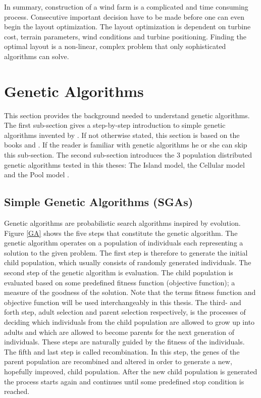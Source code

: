 \noindent In summary, construction of a wind farm is a complicated and time consuming process. Consecutive important decision have to be made before one can even begin the layout optimization. The layout optimization is dependent on turbine cost, terrain parameters, wind conditions and turbine positioning. Finding the optimal layout is a non-linear, complex problem that only sophisticated algorithms can solve.


\section{Genetic Algorithms}\label{section:ga}
This section provides the background needed to understand genetic algorithms. The first sub-section gives a step-by-step introduction to simple genetic algorithms invented by \cite{Holland}. If not otherwise stated, this section is based on the books \cite{Holland} and \cite{Goldberg}. If the reader is familiar with genetic algorithms he or she can skip this sub-section. The second sub-section introduces the 3 population distributed genetic algorithms tested in this theses: The Island model, the Cellular model and the Pool model \citep{Gong}.\\


\subsection{Simple Genetic Algorithms (SGAs)}\label{subsection:sga}
Genetic algorithms are probabilistic search algorithms inspired by evolution. Figure \ref{GA} shows the five steps that constitute the genetic algorithm. The genetic algorithm operates on a population of individuals each representing a solution to the given problem. The first step is therefore to generate the initial child population, which usually consists of randomly generated individuals. The second step of the genetic algorithm is evaluation. The child population is evaluated based on some predefined fitness function (objective function); a measure of the goodness of the solution. Note that the terms fitness function and objective function will be used interchangeably in this thesis. The third- and forth step, adult selection and parent selection respectively, is the processes of deciding which individuals from the child population are allowed to grow up into adults and which are allowed to become parents for the next generation of individuals. These steps are naturally guided by the fitness of the individuals. The fifth and last step is called recombination. In this step, the genes of the parent population are recombined and altered in order to generate a new, hopefully improved, child population. After the new child population is generated the process starts again and continues until some predefined stop condition is reached. \\


